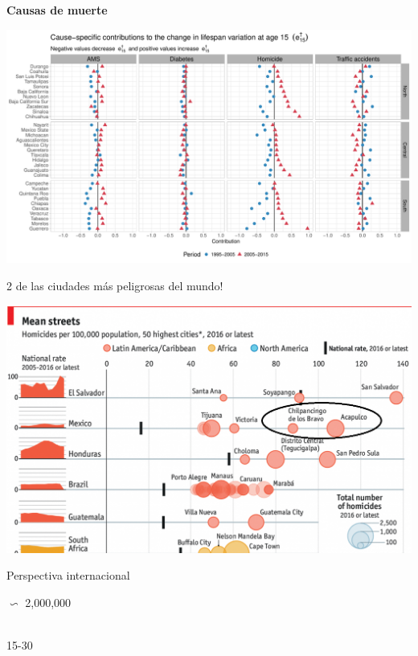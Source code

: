 \documentclass[xcolor={dvipsnames}]{beamer}
\begin{document}
\begin{frame}
\begin{center}
\Large{\textbf{Causas de muerte}}
\end{center}

\hspace*{-1cm}   
\includegraphics[scale=.38]{Figures/Figure_4}

\end{frame}


\begin{frame}

\Large{
2 de las ciudades m\'as peligrosas del mundo!

				\begin{center}
		\includegraphics[scale=.38]{Figures/Capture}
				\end{center}				

}
\end{frame}


\begin{frame}
\Huge{
\begin{center}
Perspectiva internacional \linebreak \\

{\fontsize{70}{80}\selectfont 

 $\backsim$ 2,000,000}\\
15-30

\end{center}
}
\end{frame}
\end{document}
